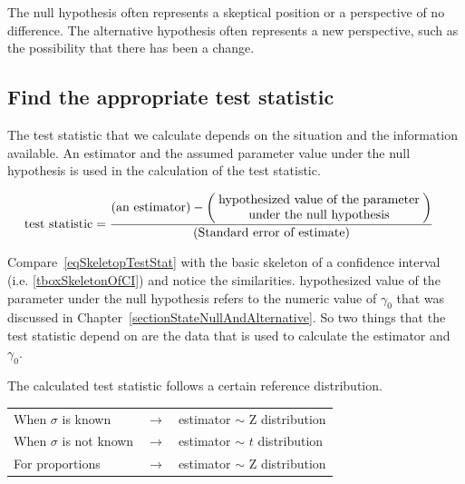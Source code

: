 The null hypothesis often represents a skeptical position or a perspective of no difference. The alternative hypothesis often represents a new perspective, such as the possibility that there has been a change. 



\subsection{Find the appropriate test statistic}
\label{sectionFindingAppropriateTestStat}

The test statistic that we calculate depends on the situation and the information available.
An estimator and the assumed parameter value under the null hypothesis is
used in the calculation of the test statistic.

\begin{termBox}{
\vspace{-3mm}
\begin{align}
\text{test statistic}	& = 	\frac{(\text{an estimator}) - \bigg(\parbox{5.75cm}{\centering hypothesized value of the parameter under the null hypothesis}\bigg)}{(\text{Standard error of estimate})}\label{eqSkeletopTestStat}
\end{align}
\vspace{-3mm}
}
\end{termBox}


Compare~\vref{eqSkeletopTestStat} with
the basic skeleton of a confidence interval (i.e. \vref{tboxSkeletonOfCI})
and notice the similarities.
hypothesized value of the parameter under the null hypothesis refers to the numeric value of
$\gamma_0$ that was discussed in Chapter~\ref{sectionStateNullAndAlternative}.
So two things that the test statistic depend on are the data that is used to calculate the estimator
and $\gamma_0$.

The calculated test statistic follows a certain reference distribution.

\begin{termBox}{

\begin{tabular}{l c l}
When $\sigma$ is known		&	$\longrightarrow$	&	estimator $\sim$ Z distribution		\\
When $\sigma$ is not known	&	$\longrightarrow$	&	estimator $\sim$ $t$ distribution	\\
For proportions				&	$\longrightarrow$	&	estimator $\sim$ Z distribution
\end{tabular}
}
\end{termBox}

